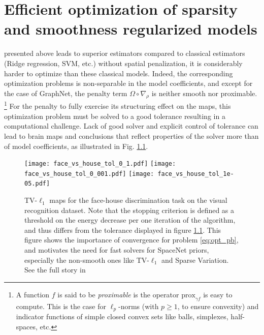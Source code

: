 \chapter{Efficient optimization of sparsity and smoothness regularized models}\label{chap:efficient_opt}

 presented above leads to superior estimators compared to classical estimators (Ridge regression, SVM, etc.) without spatial penalization, it is considerably harder to optimize than these classical models. Indeed, the corresponding optimization problems is non-separable in the model coefficients, and except for the case of GraphNet,
the penalty term $\Omega \circ \nabla_\rho$ is neither smooth nor proximable.
\footnote{ A function $f$ is said to be \textit{proximable} is the operator $\text{prox}_{\gamma f}$ is easy to compute. This is the case for $\ell_p$-norms  (with $ p \ge 1$, to ensure convexity) and indicator functions of simple closed convex sets like balls, simplexes, half-spaces, etc.}
For the penalty to fully exercise its
structuring effect on the maps, this optimization problem must be
solved to a good tolerance resulting in a computational challenge. Lack of good solver and explicit control of
tolerance can lead to brain maps and conclusions that reflect
properties of the solver more than of model coefficients, as illustrated in Fig. \ref{Fig:benchmarks_prni}.

\begin{figure}[!htb]
    \texttt{[image: face\_vs\_house\_tol\_0\_1.pdf]}%
\hfill%
\texttt{[image: face\_vs\_house\_tol\_0\_001.pdf]}%
\hfill%
\texttt{[image: face\_vs\_house\_tol\_1e-05.pdf]}%
%

\caption{TV-$\ell_1$ maps for the face-house discrimination task on
  the visual recognition dataset.
  Note that
  the stopping criterion is defined as a threshold on the energy
  decrease per one iteration of the algorithm, and thus differs from
  the tolerance displayed in figure \ref{Fig:benchmarks_prni}.  This figure shows
  the importance of convergence for problem \eqref{eq:opt_pb}, and motivates
  the need for fast solvers for SpaceNet priors, especially the non-smooth ones like TV-$\ell_1$ and Sparse Variation. See the full story in
  \citep{dohmatob2014benchmarking}}
  \label{Fig:benchmarks_prni}
\end{figure}

